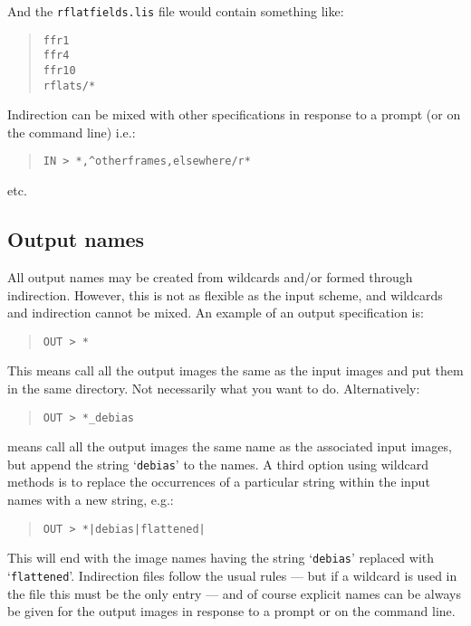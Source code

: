 \documentclass[twoside,11pt]{article}
\newcommand{\latexhtml}[2]{#1}
\renewcommand{\_}{\texttt{\symbol{95}}}
\newcommand{\ttsize}{\latexhtml{\small}{}}
\newenvironment{myquote}{\begin{quote}\ttsize}{\end{quote}}
\newcommand{\text}[1]{{\ttsize \tt #1}}
\begin{document}
And the \text{rflatfields.lis} file would contain something like:
\begin{myquote}
\begin{verbatim}
ffr1
ffr4
ffr10
rflats/*
\end{verbatim}
\end{myquote}

Indirection can be mixed with other specifications in response to a
prompt (or on the command line) i.e.:
\begin{myquote}
\begin{verbatim}
IN > *,^otherframes,elsewhere/r*
\end{verbatim}
\end{myquote}
etc.

\subsection{Output names}

All output names may be created from wildcards and/or formed through
indirection. However, this is not as flexible as the input scheme,
and wildcards and indirection cannot be mixed. An example of an
output specification is:
\begin{myquote}
\begin{verbatim}
OUT > *
\end{verbatim}
\end{myquote}
This means call all the output images the same as the input images and put
them in the same directory.
Not necessarily what you want to do.
Alternatively:
\begin{myquote}
\begin{verbatim}
OUT > *_debias
\end{verbatim}
\end{myquote}
means call all the output images the same name as the associated
input images, but append the string `\text{\_debias}' to the names. A
third option using wildcard methods is to replace the occurrences of a
particular string within the input names with a new string, e.g.:
\begin{myquote}
\begin{verbatim}
OUT > *|debias|flattened|
\end{verbatim}
\end{myquote}
This will end with the image names having the string `\text{debias}'
replaced with `\text{flattened}'. Indirection files follow the usual
rules --- but if a wildcard is used in the file this must be the only
entry --- and of course explicit names can be always be given for the
output images in response to a prompt or on the command line.
\end{document}
